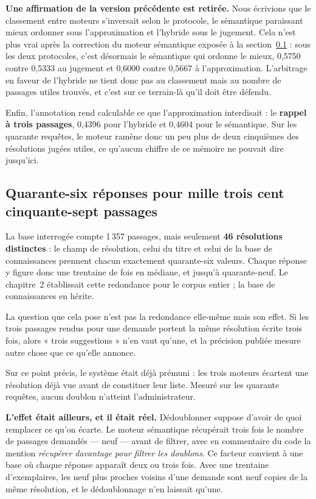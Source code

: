 \textbf{Une affirmation de la version précédente est retirée.} Nous écrivions que le classement
entre moteurs s'inversait selon le protocole, le sémantique paraissant mieux ordonner sous
l'approximation et l'hybride sous le jugement. Cela n'est plus vrai après la correction du moteur
sémantique exposée à la section~\ref{sec:doublons5} : sous les deux protocoles, c'est désormais le
sémantique qui ordonne le mieux, 0,5750 contre 0,5333 au jugement et 0,6000 contre 0,5667 à
l'approximation. L'arbitrage en faveur de l'hybride ne tient donc pas au classement mais au nombre
de passages utiles trouvés, et c'est sur ce terrain-là qu'il doit être défendu.

Enfin, l'annotation rend calculable ce que l'approximation interdisait : le \textbf{rappel à trois
passages}, 0,4396 pour l'hybride et 0,4604 pour le sémantique. Sur les quarante requêtes, le moteur
ramène donc un peu plus de deux cinquièmes des résolutions jugées utiles, ce qu'aucun chiffre de ce
mémoire ne pouvait dire jusqu'ici.

\subsection{Quarante-six réponses pour mille trois cent cinquante-sept passages}

\label{sec:doublons5}

La base interrogée compte 1\,357 passages, mais seulement \textbf{46 résolutions distinctes} : le
champ de résolution, celui du titre et celui de la base de connaissances prennent chacun exactement
quarante-six valeurs. Chaque réponse y figure donc une trentaine de fois en médiane, et jusqu'à
quarante-neuf. Le chapitre~2 établissait cette redondance pour le corpus entier ; la base de
connaissances en hérite.

La question que cela pose n'est pas la redondance elle-même mais son effet. Si les trois passages
rendus pour une demande portent la même résolution écrite trois fois, alors « trois suggestions »
n'en vaut qu'une, et la précision publiée mesure autre chose que ce qu'elle annonce.

Sur ce point précis, le système était déjà prémuni : les trois moteurs écartent une résolution déjà
vue avant de constituer leur liste. Mesuré sur les quarante requêtes, aucun doublon n'atteint
l'administrateur.

\textbf{L'effet était ailleurs, et il était réel.} Dédoublonner suppose d'avoir de quoi remplacer
ce qu'on écarte. Le moteur sémantique récupérait trois fois le nombre de passages demandés — neuf —
avant de filtrer, avec en commentaire du code la mention \emph{récupérer davantage pour filtrer les
doublons}. Ce facteur convient à une base où chaque réponse apparaît deux ou trois fois. Avec une
trentaine d'exemplaires, les neuf plus proches voisins d'une demande sont neuf copies de la même
résolution, et le dédoublonnage n'en laissait qu'une.


